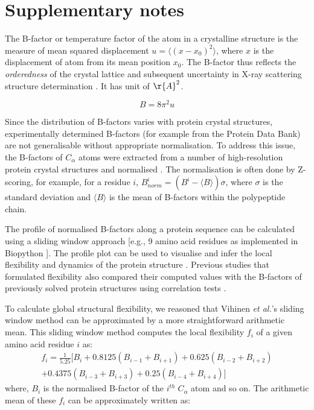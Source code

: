 

\section{Supplementary notes}
\label{section:appendix_solubility_supp_notes}
The B-factor or temperature factor of the atom in a crystalline structure is the measure of mean squared displacement $u = \langle (x-x_0)^{2} \rangle$, where $x$ is the displacement of atom from its mean position $x_0$. The B-factor thus reflects the \textit{orderedness} of the crystal lattice and subsequent uncertainty in X-ray scattering structure determination \cite{Schlessinger2005-ps, Carugo2018-ka, Bramer2018-dh}. It has unit of $\r{A}^2$.

\begin{equation*}
    B = 8\pi^2 u
\end{equation*}

Since the distribution of B-factors varies with protein crystal structures, experimentally determined B-factors (for example from the Protein Data Bank) are not generalisable without appropriate normalisation. To address this issue, the B-factors of $C_\alpha$ atoms were extracted from a number of high-resolution protein crystal structures and normalised \cite{Schlessinger2005-ps, Smith2003-gb, Karplus1985-ea, Vihinen1987-jo}. The normalisation is often done by Z-scoring, for example, for a residue $i$, $B_{norm}^i = (B^i - \langle B \rangle)\sigma$, where $\sigma$ is the standard deviation and $\langle B\rangle$ is the mean of B-factors within the polypeptide chain. 

The profile of normalised B-factors along a protein sequence can be calculated using a sliding window approach [e.g., 9 amino acid residues as implemented in Biopython \cite{Vihinen1987-jo, Cock2009-jl}]. The profile plot can be used to visualise and infer the local flexibility and dynamics of the protein structure \cite{Karplus1985-ea, Vihinen1987-jo}. Previous studies that formulated flexibility also compared their computed values with the B-factors of previously solved protein structures using correlation tests \cite{Vihinen1987-jo, vihinen1994accuracy}.

To calculate global structural flexibility, we reasoned that Vihinen \textit{et al.}’s \cite{vihinen1994accuracy} sliding window method can be approximated by a more straightforward arithmetic mean. This sliding window method computes the local flexibility $f_i$ of a given amino acid residue $i$ as:
\begin{align*} 
    f_i = \frac{1}{5.25}[B_i + 0.8125(B_{i-1} + B_{i+1}) + 0.625(B_{i-2} + B_{i+2})\\
    + 0.4375(B_{i-3} + B_{i+3}) + 0.25(B_{i-4} + B_{i+4})]
\end{align*}
where, $B_i$ is the normalised B-factor of the $i^{th} \; C_\alpha$ atom and so on. The arithmetic mean of these $f_i$ can be approximately written as:

